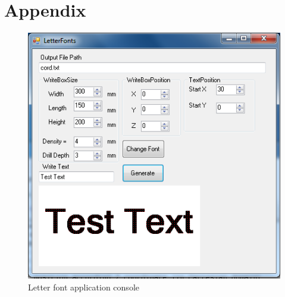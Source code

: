 \newpage
\section{Appendix}
\label{sec:append}

\begin{figure}[H]
  \centering
  \includegraphics[scale= 0.6]{source/LetterFontsFinal.png}
  \caption{Letter font application console}
  \label{fig:LetterFontsFinal}
\end{figure}
